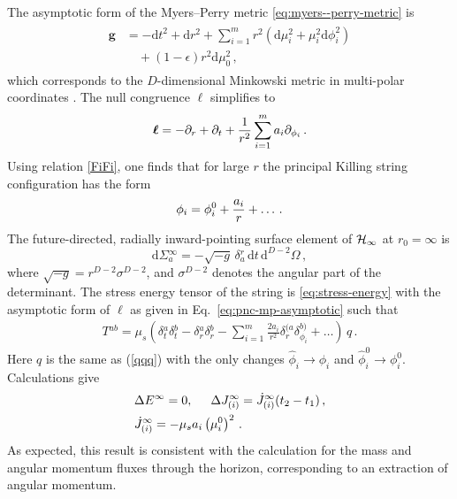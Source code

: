\documentclass[superscriptaddress,twocolumn,showpacs,
preprintnumbers,amsmath,amssymb,nofootinbib,
longbibliography,aps,prd,10pt]{revtex4-1}
\newcommand{\hh}{,\hspace{0.5cm}}
\newcommand{\ts}[1]{{\boldsymbol{#1}}}         %
\newcommand{\dd}{\mbox{d}}
\newcommand{\be}{\begin{equation}}             %
\newcommand{\ee}{\end{equation}}               %
\newcommand{\n}[1]{\label{#1}}
\begin{document}
The asymptotic form of the Myers--Perry metric \eqref{eq:myers--perry-metric} is
\begin{align}
\begin{split}
\ts{g} &= -\dd t^2 + \dd r^2 + \sum\limits_{i=1}^m r^2 \left(\dd\mu_i^2 + \mu_i^2 \dd \phi_i^2\right) \\
&\hspace{12pt} + (1-\epsilon) r^2 \dd \mu_0^2 \, , \label{eq:minkowski}
\end{split}
\end{align}
which corresponds to the $D$-dimensional Minkowski metric in multi-polar coordinates \cite{Myers:2011yc}. The null congruence $\ts{\ell}$ simplifies to
\begin{align}
\ts{\ell} = - \partial_r + \partial_t  +{1\over r^2} \sum\limits_{i=1}^m a_i \partial_{\phi_i} \, . \label{eq:pnc-mp-asymptotic}
\end{align}
Using relation \eqref{FiFi}, one finds that for large $r$ the principal Killing string configuration has the form
\be\n{phiass}
\phi_i=\phi_i^0 +{a_i\over r}+\ldots \, .
\ee
The future-directed, radially inward-pointing surface element of ${\cal H}_{\infty}$ at $r_0=\infty$ is
\be
\dd \Sigma{}^\infty_a = -\sqrt{-g} \, \delta{}^r_a \, \dd t \, \dd ^{D-2}\Omega\, ,
\ee
where $\sqrt{-g} = r^{D-2} \sigma^{D-2}$, and $\sigma^{D-2}$ denotes the angular part of the determinant. The stress energy tensor of the string is \eqref{eq:stress-energy} with the asymptotic form of $\ts{\ell}$ as given in Eq.~\eqref{eq:pnc-mp-asymptotic} such that
\begin{align}
T{}^{ab} = \mu_s \left( \delta{}^a_t \delta{}^b_t - \delta{}^a_r \delta{}^b_r - \sum\limits_{i=1}^m \frac{2 a_i}{r^2} \delta{}^{(a}_r \delta{}^{b)}_{\phi_i} +  \dots \right) \, q \, .
\end{align}
Here $q$ is the same as (\ref{qqq}) with the only changes $\hat{\phi}_i\to \phi_i$ and $\hat{\phi}_i^0\to \phi_i^0$. Calculations give
\begin{align}
\begin{split}
&\Delta E^\infty =0\hh \Delta J^\infty_{(i)}=\dot{J}^\infty_{(i)}(t_2-t_1)\, ,\\
&\dot{J}^\infty_{(i)}=-\mu_s a_i \left( \mu_i^0 \right)^2\, .\n{MJINF}
\end{split}
\end{align}
As expected, this result is consistent with the calculation for the mass and angular momentum fluxes through the horizon, corresponding to an extraction of angular momentum.
\end{document}
